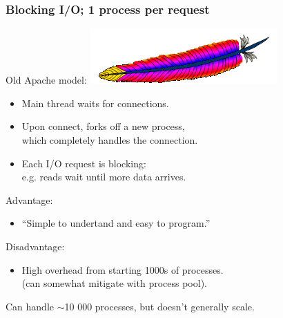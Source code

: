 \begin{frame}
  \frametitle{Blocking I/O; 1 process per request}

  
  Old Apache model: \hfill \includegraphics[width=.2\textwidth]{images/httpd_logo_wide_new}

  \begin{itemize}
    \item Main thread waits for connections.
    \item Upon connect, forks off a new process, \\which completely
      handles the connection.
    \item Each I/O request is blocking: \\ e.g. reads wait until more data arrives.
  \end{itemize}

  Advantage: 
  \begin{itemize}
    \item ``Simple to undertand and easy to program.''
  \end{itemize}

  Disadvantage:
  \begin{itemize}
    \item High overhead from starting 1000s of processes.\\
      (can somewhat mitigate with process pool).
  \end{itemize}
  Can handle $\sim$10 000 processes, but doesn't generally scale.

  

\end{frame}

